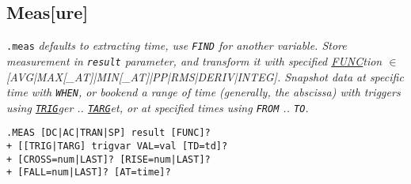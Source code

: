 \subsection*{Meas[ure]}
\texttt{.meas} \textit{ defaults to extracting time, use \texttt{FIND} for another variable. Store measurement in \texttt{result} parameter, and transform it with specified \underline{FUNC}tion $\in$ {\scriptsize [AVG|MAX[\_AT]|MIN[\_AT]|PP|RMS|DERIV|INTEG]}. Snapshot data at specific time with \texttt{WHEN}, or bookend a range of time (generally, the abscissa) with triggers using \texttt{\underline{TRIG}}ger .. \texttt{\underline{TARG}}et, or at specified times using \texttt{FROM} .. \texttt{TO}.}\\
\begin{lstlisting}
.MEAS [DC|AC|TRAN|SP] result [FUNC]?
+ [[TRIG|TARG] trigvar VAL=val [TD=td]? 
+ [CROSS=num|LAST]? [RISE=num|LAST]?
+ [FALL=num|LAST]? [AT=time]?
\end{lstlisting}
\\
\\
\\
 \\
\\
 \\
\\
\\
 \\
\\
 \\
 \\


